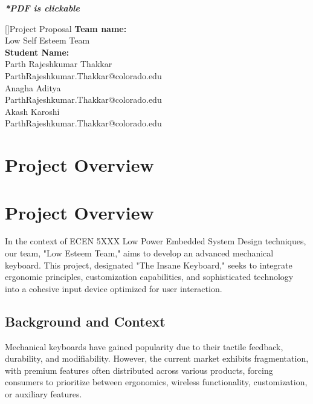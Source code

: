 \documentclass[a4paper,11pt]{article}%
\begin{document}


\pagebreak

\tableofcontents
\listoffigures
\listoftables
\vfill
\begin{center}
	\textbf{\textit{*PDF is clickable}}
\end{center}

\pagebreak

[]{Project Proposal}
\textbf{Team name:}\\
Low Self Esteem Team\\

\textbf{Student Name:}\\
Parth Rajeshkumar Thakkar\\
ParthRajeshkumar.Thakkar@colorado.edu\\

Anagha Aditya\\
ParthRajeshkumar.Thakkar@colorado.edu\\

Akash Karoshi\\
ParthRajeshkumar.Thakkar@colorado.edu\\

\section{Project Overview}
\section{Project Overview}
\author{Parth Thakkar}

In the context of ECEN 5XXX Low Power Embedded System Design techniques, our team, "Low Esteem Team," aims to develop an advanced mechanical keyboard. This project, designated "The Insane Keyboard," seeks to integrate ergonomic principles, customization capabilities, and sophisticated technology into a cohesive input device optimized for user interaction.

\subsection{Background and Context}
Mechanical keyboards have gained popularity due to their tactile feedback, durability, and modifiability. However, the current market exhibits fragmentation, with premium features often distributed across various products, forcing consumers to prioritize between ergonomics, wireless functionality, customization, or auxiliary features.
\end{document}
